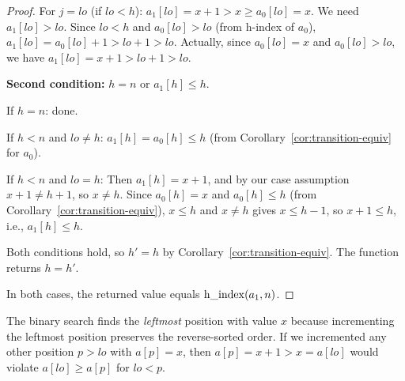 \begin{proof}
For $j = \mathit{lo}$ (if $\mathit{lo} < h$): $a_1[\mathit{lo}] = x + 1 > x \geq a_0[\mathit{lo}] = x$.
We need $a_1[\mathit{lo}] > \mathit{lo}$.
Since $\mathit{lo} < h$ and $a_0[\mathit{lo}] > \mathit{lo}$ (from h-index of $a_0$),
$a_1[\mathit{lo}] = a_0[\mathit{lo}] + 1 > \mathit{lo} + 1 > \mathit{lo}$.
Actually, since $a_0[\mathit{lo}] = x$ and $a_0[\mathit{lo}] > \mathit{lo}$,
we have $a_1[\mathit{lo}] = x + 1 > \mathit{lo} + 1 > \mathit{lo}$. \checkmark

\textbf{Second condition:} $h = n$ or $a_1[h] \leq h$.

If $h = n$: done.

If $h < n$ and $\mathit{lo} \neq h$: $a_1[h] = a_0[h] \leq h$ (from Corollary~\ref{cor:transition-equiv}
for $a_0$). \checkmark

If $h < n$ and $\mathit{lo} = h$: Then $a_1[h] = x + 1$, and by our case assumption $x + 1 \neq h + 1$,
so $x \neq h$. Since $a_0[h] = x$ and $a_0[h] \leq h$ (from Corollary~\ref{cor:transition-equiv}),
$x \leq h$ and $x \neq h$ gives $x \leq h - 1$, so $x + 1 \leq h$, i.e., $a_1[h] \leq h$. \checkmark

Both conditions hold, so $h' = h$ by Corollary~\ref{cor:transition-equiv}.
The function returns $h = h'$. \checkmark

\medskip
In both cases, the returned value equals $\operatorname{h\_index}(a_1, n)$.
\end{proof}

\begin{remark}
The binary search finds the \emph{leftmost} position with value $x$ because incrementing
the leftmost position preserves the reverse-sorted order. If we incremented any other
position $p > \mathit{lo}$ with $a[p] = x$, then $a[p] = x + 1 > x = a[\mathit{lo}]$
would violate $a[\mathit{lo}] \geq a[p]$ for $\mathit{lo} < p$.
\end{remark}
